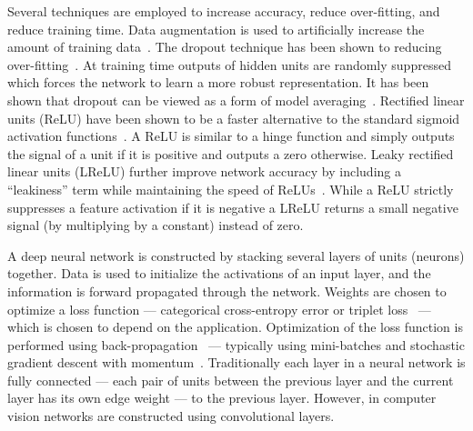     Several techniques are employed to increase accuracy, reduce over-fitting,  and reduce training time.
    Data augmentation is used to artificially increase the amount of training
      data~\cite{ciresan_multi_column_2012, ciresan_high_performance_2011, simard_best_2003}.
    The dropout technique has been shown to reducing over-fitting~\cite{dahl_improving_2013,
      srivastava_dropout_2014}.
    At training time outputs of hidden units are randomly suppressed which forces the network to learn a more
      robust representation.
    It has been shown that dropout can be viewed as a form of model averaging~\cite{hinton_improving_2012}.
    Rectified linear units (ReLU) have been shown to be a faster alternative to the standard sigmoid activation
      functions~\cite{vinod_rectified_2010, dahl_improving_2013}.
    A ReLU is similar to a hinge function and simply outputs the signal of a unit if it is positive and outputs a
      zero otherwise.
    Leaky rectified linear units (LReLU) further improve network accuracy by including a ``leakiness'' term while
      maintaining the speed of ReLUs~\cite{maas_rectifier_2013}.
    While a ReLU strictly suppresses a feature activation if it is negative a LReLU returns a small negative
      signal (by multiplying by a constant) instead of zero.

    A deep neural network is constructed by stacking several layers of units (neurons) together. Data is used to
    initialize the activations of an input layer, and the information is forward propagated through the network.
    Weights are chosen to optimize a loss function --- \eg{} categorical cross-entropy error or triplet
    loss~\cite{schroff_facenet_2015} --- which is chosen to depend on the application. Optimization of the loss
    function is performed using back-propagation~\cite{rumelhart_learning_1986} --- typically using mini-batches
    and stochastic gradient descent with momentum~\cite{sutskever_importance_2013}. Traditionally each layer in a
    neural network is fully connected --- each pair of units between the previous layer and the current layer has
    its own edge weight ---  to the previous layer. However, in computer vision networks are constructed using
    convolutional layers.

